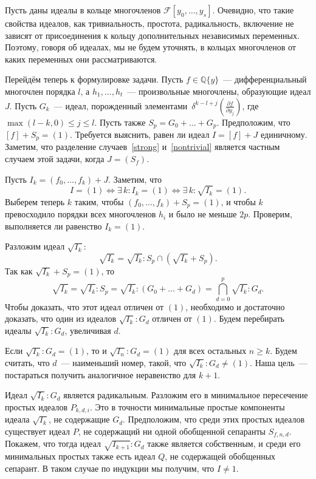 \documentclass[11pt]{article}
\renewcommand{\le}{\leqslant}
\renewcommand{\ge}{\geqslant}
\newcommand{\diffField}{\mathcal{F}}
\theoremstyle{plain}
\theoremstyle{definition}
\theoremstyle{remark}
\begin{document}
\bigskip

Пусть даны идеалы в кольце многочленов $\diffField[y_0, \ldots, y_s]$.
Очевидно, что такие свойства идеалов, как тривиальность, простота, радикальность, включение
не зависят от присоединения к кольцу дополнительных независимых переменных.
Поэтому, говоря об идеалах, мы не будем уточнять, в кольцах многочленов от каких переменных они рассматриваются.


\bigskip

Перейдём теперь к формулировке задачи.
Пусть $f \in \mathbb{Q}\{y\}$~--- дифференциальный многочлен порядка $l$,
а $h_1, \ldots, h_t$~--- произвольные многочлены, образующие идеал $J$.
Пусть $G_k$~--- идеал, порожденный элементами $\,\delta^{k-l+j} \left(\frac{\partial f}{\partial y_j}\right)$, где $\max(l-k, 0) \le j \le l$.
Пусть также $S_p = G_0 + \ldots + G_p$.
Предположим, что $[f] + S_p = (1)$.
Требуется выяснить, равен ли идеал $I = [f] + J$ единичному.
Заметим, что разделение случаев~\eqref{strong} и~\eqref{nontrivial} является частным случаем этой задачи, когда $J = (S_f)$.

\bigskip


Пусть $I_k = (f_0, \ldots, f_k) + J$. Заметим, что 
$$
 I = (1) \iff \exists \, k: I_k = (1) \iff \exists \, k: \sqrt{I_k} = (1).
$$
Выберем теперь $k$ таким, чтобы $(f_0, \ldots, f_k) + S_p = (1)$, и чтобы $k$ превосходило порядки всех многочленов $h_i$
и было не меньше $2p$.
Проверим, выполняется ли равенство $I_k = (1)$.

Разложим идеал $\sqrt{I_k}$:
$$
 \sqrt{I_k} = \sqrt{I_k} : S_p  \cap  \left(\sqrt{I_k} + S_p\right).
$$
Так как $\sqrt{I_k} + S_p = (1)$, то
$$
 \sqrt{I_k} = \sqrt{I_k} : S_p = \sqrt{I_k} : (G_0 + \ldots + G_d) = \bigcap\limits_{d = 0}^p \sqrt{I_k} : G_d.
$$
Чтобы доказать, что этот идеал отличен от $(1)$, необходимо и достаточно доказать, что один из идеалов $\sqrt{I_k}:G_d$ отличен от $(1)$.
Будем перебирать идеалы $\sqrt{I_k} : G_d$, увеличивая $d$.

Если $\sqrt{I_k} : G_d = (1)$, то и $\sqrt{I_n} : G_d = (1)$ для всех остальных $n \ge k$.
Будем считать, что $d$~--- наименьший номер, такой, что $\sqrt{I_k} : G_d \ne (1)$.
Наша цель~--- постараться получить аналогичное неравенство для $k+1$.

Идеал $\sqrt{I_k} : G_d$ является радикальным. Разложим его в минимальное пересечение простых идеалов $P_{k,d,i}$.
Это в точности минимальные простые компоненты идеала $\sqrt{I_k}$, не содержащие $G_d$.
Предположим, что среди этих простых идеалов существует идеал $P$, не содержащий ни одной обобщенной сепаранты $S_{f,n,d}$.
Покажем, что тогда идеал $\sqrt{I_{k+1}}:G_d$ также является собственным, и среди его минимальных простых также есть идеал $Q$,
не содержащей обобщенных сепарант. В таком случае по индукции мы получим, что $I \ne 1$.
\end{document}
